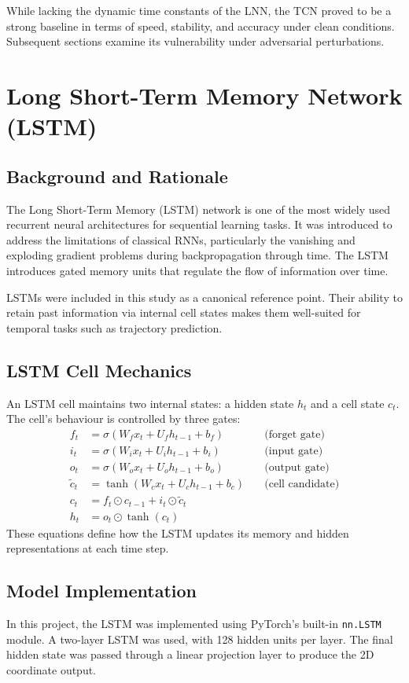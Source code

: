 While lacking the dynamic time constants of the LNN, the TCN proved to be a strong baseline in terms of speed, stability, and accuracy under clean conditions. Subsequent sections examine its vulnerability under adversarial perturbations.


\section{Long Short-Term Memory Network (LSTM)}

\subsection{Background and Rationale}
The Long Short-Term Memory (LSTM) network is one of the most widely used recurrent neural architectures for sequential learning tasks. It was introduced to address the limitations of classical RNNs, particularly the vanishing and exploding gradient problems during backpropagation through time. The LSTM introduces gated memory units that regulate the flow of information over time.

LSTMs were included in this study as a canonical reference point. Their ability to retain past information via internal cell states makes them well-suited for temporal tasks such as trajectory prediction.

\subsection{LSTM Cell Mechanics}
An LSTM cell maintains two internal states: a hidden state $h_t$ and a cell state $c_t$. The cell's behaviour is controlled by three gates:
\[
\begin{aligned}
f_t &= \sigma(W_f x_t + U_f h_{t-1} + b_f) \quad &\text{(forget gate)} \\
i_t &= \sigma(W_i x_t + U_i h_{t-1} + b_i) \quad &\text{(input gate)} \\
o_t &= \sigma(W_o x_t + U_o h_{t-1} + b_o) \quad &\text{(output gate)} \\
\tilde{c}_t &= \tanh(W_c x_t + U_c h_{t-1} + b_c) \quad &\text{(cell candidate)} \\
c_t &= f_t \odot c_{t-1} + i_t \odot \tilde{c}_t \\
h_t &= o_t \odot \tanh(c_t)
\end{aligned}
\]
These equations define how the LSTM updates its memory and hidden representations at each time step.

\subsection{Model Implementation}
In this project, the LSTM was implemented using PyTorch’s built-in \texttt{nn.LSTM} module. A two-layer LSTM was used, with 128 hidden units per layer. The final hidden state was passed through a linear projection layer to produce the 2D coordinate output.

